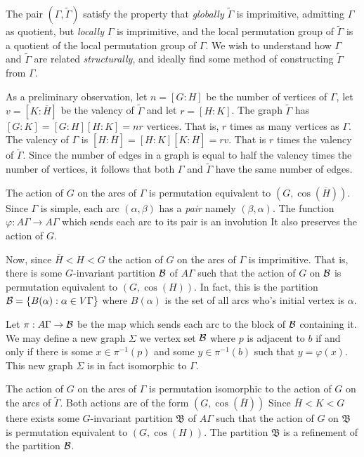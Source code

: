The pair $(\Gamma,\widetilde{\Gamma})$ satisfy the property that
{\it globally} $\widetilde{\Gamma}$ is imprimitive,
admitting $\Gamma$ as quotient, but {\it locally}
$\Gamma$ is imprimitive, and the local permutation group of
$\widetilde{\Gamma}$ is a quotient of the local permutation
group of $\Gamma$. We wish to understand how $\Gamma$
and $\widetilde{\Gamma}$ are related {\it structurally},
and ideally find some method of constructing $\widetilde{\Gamma}$
from $\Gamma$.

As a preliminary observation, let $n = [G:H]$ be the number of vertices of $\Gamma$,
let $v = [K:\overline{H}]$ be the valency of $\widetilde{\Gamma}$
and let $r = [H:K]$.
The graph $\widetilde{\Gamma}$ has $[G:K] = [G:H][H:K] = nr$
vertices. That is, $r$ times as many vertices as $\Gamma$.
The valency of $\Gamma$ is $[H:\overline{H}] = [H:K][K:\overline{H}] = rv$.
That is $r$ times the valency of $\widetilde{\Gamma}$.
Since the number of edges in a graph is equal to half the
valency times the number of vertices, it follows that
both $\Gamma$ and $\widetilde{\Gamma}$ have the same number of edges.
\hfill \break


The action of $G$ on the arcs of $\Gamma$ is permutation equivalent
to $(G, \cos(\overline{H}))$.
Since $\Gamma$ is simple, each arc $(\alpha,\beta)$ has a {\it pair}
namely $(\beta,\alpha)$.
The function $\varphi : A \Gamma \to A \Gamma$
which sends each arc to its pair is an involution
It also preserves the action of $G$.

Now, since $\overline{H} < H < G$ the action of $G$
on the arcs of $\Gamma$ is imprimitive.
That is, there is some $G$-invariant partition $\mathcal{B}$
of $A \Gamma$ such that the action of $G$ on $\mathcal{B}$
is permutation equivalent to $(G, \cos(H))$.
In fact, this is the partition $\mathcal{B} = \{ B(\alpha) : \alpha \in V \Gamma \}$
where $B(\alpha)$ is the set of all arcs who's initial vertex is $\alpha$.

Let $\pi : A \Gamma \to \mathcal{B}$ be the map which sends
each arc to the block of $\mathcal{B}$ containing it.
We may define a new graph $\Sigma$ we vertex set
$\mathcal{B}$ where $p$ is adjacent to $b$ if and only if
there is some $x \in \pi^{-1}(p)$ and some $y \in \pi^{-1}(b)$
such that $y = \varphi(x)$.
This new graph $\Sigma$ is in fact isomorphic to $\Gamma$.


The action of $G$ on the arcs of $\Gamma$ is permutation
isomorphic to the action of $G$ on the arcs of $\widetilde{\Gamma}$.
Both actions are of the form $(G, \cos(\overline{H}))$
Since $\overline{H} < K < G$ there exists some $G$-invariant partition
$\mathfrak{B}$ of $A \Gamma$ such that the action of $G$ on $\mathfrak{B}$
is permutation equivalent to $(G, \cos(H))$.
The partition $\mathfrak{B}$ is a refinement of the partition $\mathcal{B}$.

